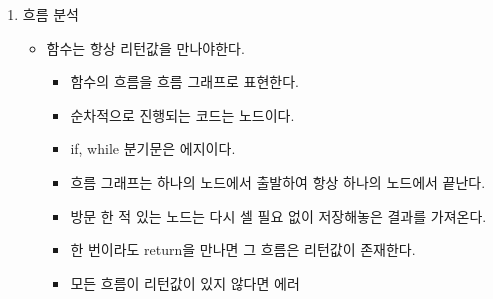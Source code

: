 \documentclass[11pt]{article}
\begin{document}
\begin{enumerate}
\item 흐름 분석
\begin{itemize}
\item[{$\boxtimes$}] 함수는 항상 리턴값을 만나야한다.
\begin{itemize}
\item[{$\boxtimes$}] 함수의 흐름을 흐름 그래프로 표현한다.
\item[{$\boxtimes$}] 순차적으로 진행되는 코드는 노드이다.
\item[{$\boxtimes$}] if, while 분기문은 에지이다.
\item[{$\boxtimes$}] 흐름 그래프는 하나의 노드에서 출발하여 항상 하나의 노드에서 끝난다.
\item[{$\boxtimes$}] 방문 한 적 있는 노드는 다시 셀 필요 없이 저장해놓은 결과를 가져온다.
\item[{$\boxtimes$}] 한 번이라도 return을 만나면 그 흐름은 리턴값이 존재한다.
\item[{$\boxtimes$}] 모든 흐름이 리턴값이 있지 않다면 에러
\end{itemize}
\end{itemize}
\end{enumerate}
\end{document}
